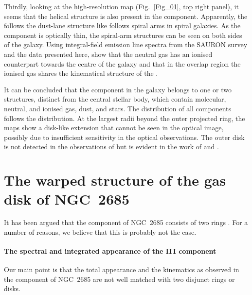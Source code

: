 \documentclass[oldversion]{aa}
\begin{document}
Thirdly, looking at the high-resolution  map
(Fig.~\ref{Fig_01}, top right panel), it seems that the helical
structure is also present in the  component. Apparently, the
 follows the dust-lane structure like  follows
spiral arms in spiral galaxies. As the  component is
optically thin, the spiral-arm structures can be seen on both sides of
the galaxy. Using integral-field emission line spectra from the SAURON
survey \citep[][]{Emsellem04} and the  data presented here,
\citet[][]{Morganti06} show that the neutral gas 
has an ionised counterpart towards the centre \citep[see
also][]{Ulrich75} of the galaxy and that in the overlap region the
ionised gas shares the kinematical structure of the .

It can be concluded that the  component in the galaxy
belongs to one or two structures, distinct from the central stellar
body, which contain molecular, neutral, and ionised gas, dust, and
stars. The distribution of all components follows the 
distribution. At the largest radii beyond the outer projected ring,
the  maps show a disk-like extension that cannot be seen in
the optical image, possibly due to insufficient sensitivity in the
optical observations. The outer disk is not detected in the observations
of \citet[][]{Shane80} but is evident in the work of
\citet[][]{Mahon92} and \citet[][]{Schinnerer02}.
%
%
\section{The warped structure of the gas disk of NGC~2685}
\label{Sect_4}
It has been argued that the  component of NGC~2685 consists
of two rings \citep[][]{Shane77,Shane80,Mahon92,Schinnerer02}. For a
number of reasons, we believe that this is probably not the case.
%
%
\paragraph{The spectral and integrated appearance of the {H\,{\small I}}
component\\} 
Our main point is that the total  appearance
and the kinematics as observed in the  component of NGC~2685
are not well matched with two disjunct rings or disks.
\end{document}
